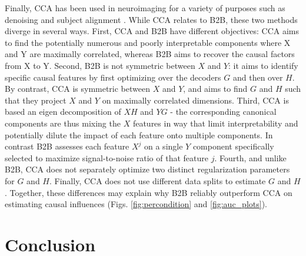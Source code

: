 \documentclass{article}
\begin{document}
Finally, CCA has been used in neuroimaging for a variety of purposes such as denoising and subject alignment \citep{cca_hotelling, de2019multiway}. While CCA relates to B2B, these two methods diverge in several ways.
First, CCA and B2B have different objectives: CCA aims to find the potentially numerous and poorly interpretable components where X and Y are maximally correlated, whereas B2B aims to recover the causal factors from X to Y.
Second, B2B is not symmetric between $X$ and $Y$: it aims to identify specific causal features by first optimizing over the decoders $G$ and then over $H$. By contrast, CCA is symmetric between $X$ and $Y$, and aims to find $G$ and $H$ such that they project $X$ and $Y$ on maximally correlated dimensions.
Third, CCA is based an eigen decomposition of $XH$ and $YG$ - the corresponding canonical components are thus mixing the $X$ features in way that limit interpretability and potentially dilute the impact of each feature onto multiple components. In contrast B2B assesses each feature $X^j$ on a single $Y$ component specifically selected to maximize signal-to-noise ratio of that feature $j$. Fourth, and unlike B2B, CCA does not separately optimize two distinct regularization parameters for $G$ and $H$.
Finally, CCA does not use different data splits to estimate $G$ and $H$.
Together, these differences may explain why B2B reliably outperform CCA on estimating causal influences (Figs. \ref{fig:percondition} and \ref{fig:auc_plots}).




\section{Conclusion}


\clearpage
\newpage




% 

%


\end{document}
